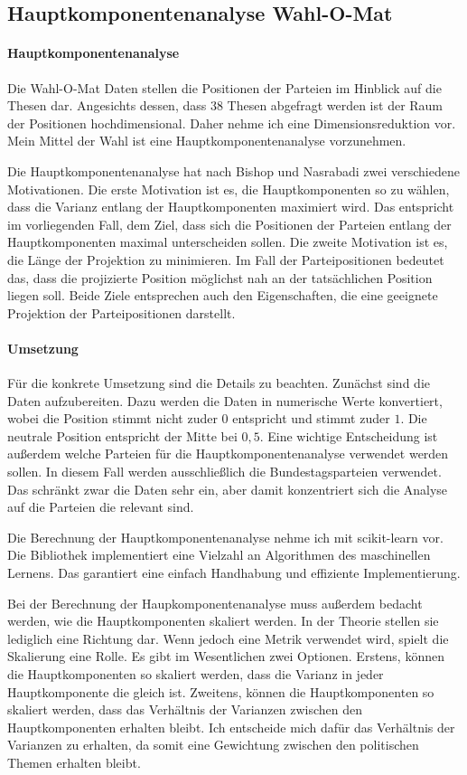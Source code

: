 \subsection{Hauptkomponentenanalyse Wahl-O-Mat}
\paragraph{Hauptkomponentenanalyse}
Die Wahl-O-Mat Daten stellen die Positionen der Parteien im Hinblick auf die Thesen dar. Angesichts dessen, dass 38 Thesen abgefragt werden ist der Raum der Positionen hochdimensional. Daher nehme ich eine Dimensionsreduktion vor. Mein Mittel der Wahl ist eine Hauptkomponentenanalyse vorzunehmen.

Die Hauptkomponentenanalyse hat nach Bishop und Nasrabadi \citep{bishop2006pattern} zwei verschiedene Motivationen. Die erste Motivation ist es, die Hauptkomponenten so zu wählen, dass die Varianz entlang der Hauptkomponenten maximiert wird. Das entspricht im vorliegenden Fall, dem Ziel, dass sich die Positionen der Parteien entlang der Hauptkomponenten maximal unterscheiden sollen. Die zweite Motivation ist es, die Länge der Projektion zu minimieren. Im Fall der Parteipositionen bedeutet das, dass die projizierte Position möglichst nah an der tatsächlichen Position liegen soll. Beide Ziele entsprechen auch den Eigenschaften, die eine geeignete Projektion der Parteipositionen darstellt.

\paragraph{Umsetzung}
Für die konkrete Umsetzung sind die Details zu beachten. Zunächst sind die Daten aufzubereiten. Dazu werden die Daten in numerische Werte konvertiert, wobei die Position \glqq stimmt nicht zu\grqq der $0$ entspricht und \glqq stimmt zu\grqq der $1$. Die neutrale Position entspricht der Mitte bei $0,5$.
Eine wichtige Entscheidung ist außerdem welche Parteien für die Hauptkomponentenanalyse verwendet werden sollen. In diesem Fall werden ausschließlich die Bundestagsparteien verwendet. Das schränkt zwar die Daten sehr ein, aber damit konzentriert sich die Analyse auf die Parteien die relevant sind.

Die Berechnung der Hauptkomponentenanalyse nehme ich mit scikit-learn \citep{scikit-learn} vor. Die Bibliothek implementiert eine Vielzahl an Algorithmen des maschinellen Lernens. Das garantiert eine einfach Handhabung und effiziente Implementierung.

Bei der Berechnung der Haupkomponentenanalyse muss außerdem bedacht werden, wie die Hauptkomponenten skaliert werden. In der Theorie stellen sie lediglich eine Richtung dar. Wenn jedoch eine Metrik verwendet wird, spielt die Skalierung eine Rolle. Es gibt im Wesentlichen zwei Optionen. Erstens, können die Hauptkomponenten so skaliert werden, dass die Varianz in jeder Hauptkomponente die gleich ist. Zweitens, können die Hauptkomponenten so skaliert werden, dass das Verhältnis der Varianzen zwischen den Hauptkomponenten erhalten bleibt. Ich entscheide mich dafür das Verhältnis der Varianzen zu erhalten, da somit eine Gewichtung zwischen den politischen Themen erhalten bleibt.

